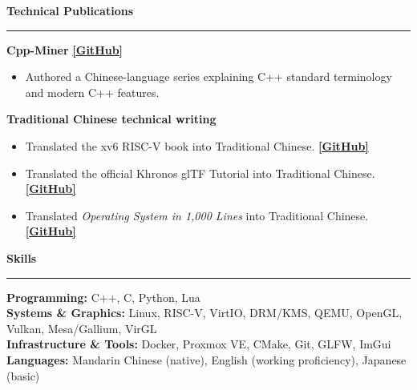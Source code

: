 \documentclass[10pt,a4paper]{article}
\newcommand{\linktag}[2]{%
  \href{#1}{{\color{sectionblue}\textbf{[#2]}}}%
}
\newcommand{\resumesection}[1]{%
  \par\addvspace{7pt}%
  {\fontsize{12.4}{14.2}\selectfont\bfseries\color{sectionblue}#1\par}%
  \vspace{-2pt}%
  {\color{sectionblue}\rule{\linewidth}{0.45pt}}\par
  \vspace{2.2pt}%
}
\begin{document}
\resumesection{Technical Publications}
\textbf{Cpp-Miner} \linktag{https://github.com/Mes0903/Cpp-Miner}{GitHub}
\begin{itemize}
  \item Authored a Chinese-language series explaining C++ standard terminology and modern C++ features.
\end{itemize}
\vspace{2.5pt}

\textbf{Traditional Chinese technical writing}
\begin{itemize}
  \item Translated the xv6 RISC-V book into Traditional Chinese. \linktag{https://github.com/Mes0903/xv6-riscv-book-zh-TW}{GitHub}
  \item Translated the official Khronos glTF Tutorial into Traditional Chinese. \linktag{https://github.com/Mes0903/glTF-Tutorials-zh-TW}{GitHub}
  \item Translated \textit{Operating System in 1,000 Lines} into Traditional Chinese. \linktag{https://github.com/nuta/operating-system-in-1000-lines}{GitHub}
\end{itemize}

\resumesection{Skills}
\textbf{Programming:} C++, C, Python, Lua\\
\textbf{Systems \& Graphics:} Linux, RISC-V, VirtIO, DRM/KMS, QEMU, OpenGL, Vulkan, Mesa/Gallium, VirGL\\
\textbf{Infrastructure \& Tools:} Docker, Proxmox VE, CMake, Git, GLFW, ImGui\\
\textbf{Languages:} Mandarin Chinese (native), English (working proficiency), Japanese (basic)
\end{document}
